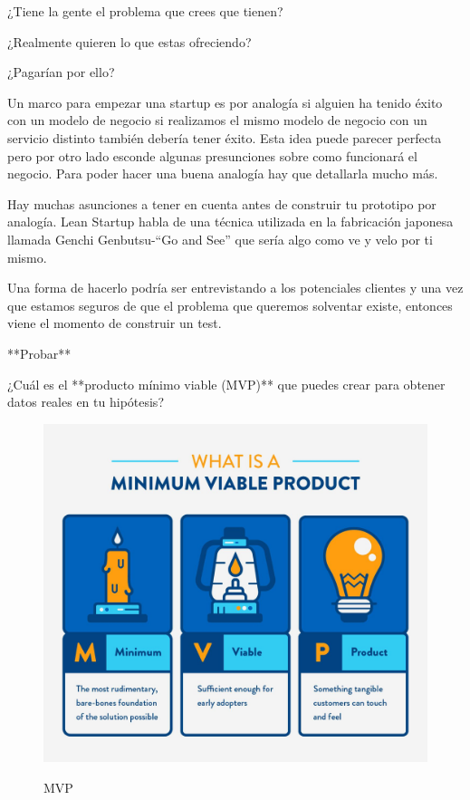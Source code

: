 \documentclass[12pt,twoside,titlepage]{report}
\begin{document}
¿Tiene la gente el problema que crees que tienen?

¿Realmente quieren lo que estas ofreciendo?

¿Pagarían por ello?

Un marco para empezar una startup es por analogía si alguien ha tenido éxito con un modelo de negocio si realizamos el mismo modelo de negocio con un servicio distinto también debería tener éxito. Esta idea puede parecer perfecta pero por otro lado esconde algunas presunciones sobre como funcionará el negocio. Para poder hacer una buena analogía hay que detallarla mucho más.

Hay muchas asunciones a tener en cuenta antes de construir tu prototipo por analogía. Lean Startup habla de una técnica utilizada en la fabricación japonesa llamada Genchi Genbutsu-“Go and See” que sería algo como ve y velo por ti mismo. 

Una forma de hacerlo podría ser entrevistando a los potenciales clientes y una vez que estamos seguros de que el problema que queremos solventar existe, entonces viene el momento de construir un test.

**Probar**

¿Cuál es el **producto mínimo viable (MVP)** que puedes crear para obtener datos reales en tu hipótesis?

\begin{figure}[H]
    \centering
    \includegraphics[scale=0.1]{MVP}
    \label{fig:MVP}
    \caption{MVP}
\end{figure}
\end{document}
